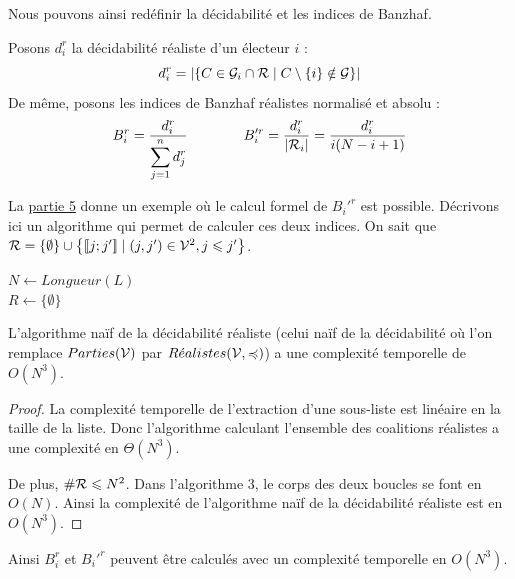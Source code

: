 Nous pouvons ainsi redéfinir la décidabilité et les indices de Banzhaf.

\begin{definition}
	Posons $d_i^r$ la décidabilité réaliste d'un électeur $i$ :
	\begin{equation}
		d_i^r
		= \left| \left\{ C \in \mathcal{G}_i \cap \mathcal{R} \;|\; C \setminus \{i\} \notin \mathcal{G} \right\} \right|
	\end{equation}
	De même, posons les indices de Banzhaf réalistes normalisé et absolu :
	\begin{equation}
		B_i^r = \frac{d_i^r}{\displaystyle \sum_{j=1}^{n} d_j^r}
		\qquad \qquad
		B_i'^r = \frac{d_i^r}{\displaystyle |\mathcal{R}_i|} = \frac{d_i^r}{i(N-i+1)}
	\end{equation}
\end{definition}

La \hyperlink{section.5}{partie 5} donne un exemple où le calcul formel de $B_i'^r$ est possible.
Décrivons ici un algorithme qui permet de calculer ces deux indices.
On sait que $\mathcal{R} = \left\{\emptyset\right\} \cup \left\{ [\![j;j']\!] \;|\; (j, j') \in \mathcal{V}^2, j \leqslant j' \right\}$. \\

\begin{algorithm}[H]
	\caption{Calcul de l'ensemble des coalitions réalistes de $(E, \preccurlyeq)$}
	
	$N \gets Longueur(L)$ \\
	$R \gets \{ \emptyset \}$ \\
	
\end{algorithm}

\begin{proposition}
	L'algorithme naïf de la décidabilité réaliste (celui naïf de la décidabilité où l'on remplace $Parties(\mathcal{V})$ par $R\acute{e}alistes(\mathcal{V}, \preccurlyeq)$) a une complexité temporelle de $O(N^3)$.
\end{proposition}

\begin{proof}
	La complexité temporelle de l'extraction d'une sous-liste est linéaire en la taille de la liste. Donc l'algorithme calculant l'ensemble des coalitions réalistes a une complexité en $\Theta(N^3)$.
	
	De plus, $\# \mathcal{R} \leqslant N^2$.
	Dans l'algorithme 3, le corps des deux boucles se font en $O(N)$.
	Ainsi la complexité de l'algorithme naïf de la décidabilité réaliste est en $O(N^3)$.
\end{proof}

Ainsi $B_i^r$ et $B_i'^r$ peuvent être calculés avec un complexité temporelle en $O(N^3)$.